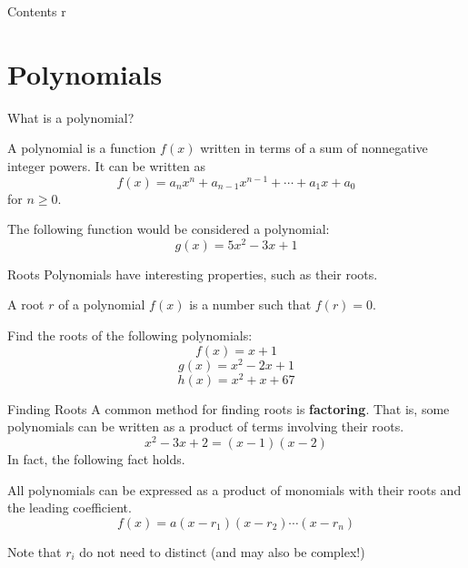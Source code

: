 \documentclass[aspectratio=169,xcolor=dvipsnames]{beamer}
\begin{document}
\begin{frame}[t]
  \titlepage
\end{frame}

\begin{frame}[t]{Contents}
  \tableofcontents
r\end{frame}

\section{Polynomials}

\begin{frame}[t]{What is a polynomial?}
    \begin{definition}
        A polynomial is a function $f(x)$ written in terms of a sum of nonnegative integer powers. It can be written as
        \[f(x)=a_nx^n+a_{n-1}x^{n-1}+\cdots +a_1x+a_0\]
        for $n\ge0$.
    
    \end{definition}
    
    \vspace{0.5cm}
    
    The following function would be considered a polynomial:
    \[
    g(x)=5x^2-3x+1
    \]
\end{frame}

\begin{frame}[t]{Roots}
    Polynomials have interesting properties, such as their roots.
    
    \begin{definition}
        A root $r$ of a polynomial $f(x)$ is a number such that $f(r)=0$.
    \end{definition}
    
    Find the roots of the following polynomials:
    \[f(x)=x+1\]
    \[g(x)=x^2-2x+1\]
    \[h(x)=x^2+x+67\]
\end{frame}

\begin{frame}[t]{Finding Roots}
    A common method for finding roots is \textbf{factoring}. That is, some polynomials can be written as a product of terms involving their roots.
    \[
    x^2-3x+2=(x-1)(x-2)
    \]
    In fact, the following fact holds.

    \begin{theorem}
        All polynomials can be expressed as a product of monomials with their roots and the leading coefficient.
        \[f(x)=a(x-r_1)(x-r_2)\cdots(x-r_n)\]
    \end{theorem}

    \vspace{0.5cm}

    Note that \(r_i\) do not need to distinct (and may also be complex!)
\end{frame}
\end{document}
